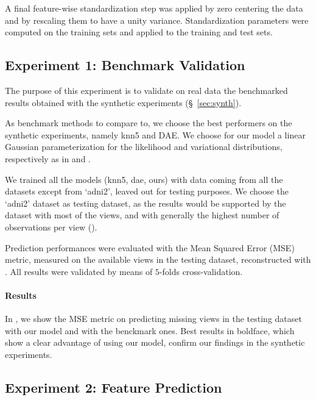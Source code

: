 A final feature-wise standardization step was applied by zero centering the data and by rescaling them to have a unity variance.
Standardization parameters were computed on the training sets and applied to the training and test sets.


\subsection{Experiment 1: Benchmark Validation}


The purpose of this experiment is to validate on real data the benchmarked results obtained with the synthetic experiments (\S~\ref{sec:synth}).

As benchmark methods to compare to, we choose the best performers on the synthetic experiments, namely knn5 and DAE.
We choose for our model a linear Gaussian parameterization for the likelihood and variational distributions, respectively as in  and .

We trained all the models (knn5, dae, ours) with data coming from all the datasets except from `adni2', leaved out for testing purposes.
We choose the `adni2' dataset as testing dataset, as the results would be supported by the dataset with most of the views, and with generally the highest number of observations per view ().

Prediction performances were evaluated with the Mean Squared Error (MSE) metric, measured on the available views in the testing dataset, reconstructed with .
All results were validated by means of $5$-folds cross-validation.

\paragraph{Results}
In , we show the MSE metric on predicting missing views in the testing dataset with our model and with the benckmark ones.
Best results in boldface, which show a clear advantage of using our model, confirm our findings in the synthetic experiments.

\subsection{Experiment 2: Feature Prediction}
\label{ssec:feats}


